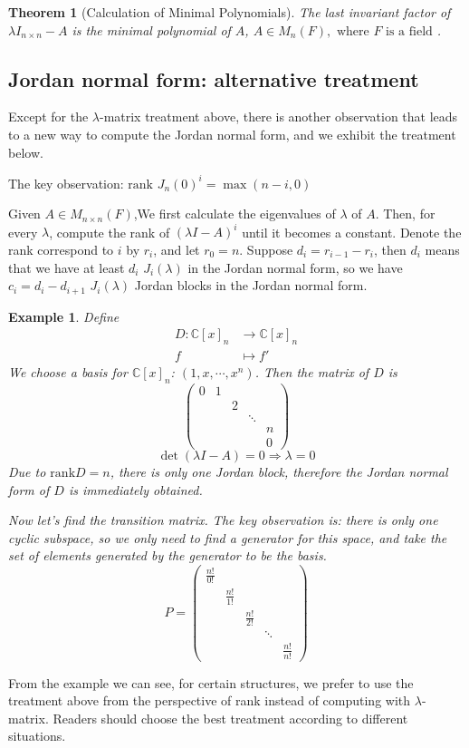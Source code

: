 \documentclass{book}
\newtheorem{theorem}{Theorem}[section]
\newtheorem{example}{Example}[section]
\theoremstyle{definition}
\begin{document}
\begin{theorem}[Calculation of Minimal Polynomials]
The last invariant factor of $\lambda I_{n\times n}-A$ is the minimal polynomial of $A$, $A\in M_n(F),\text{ where }F\text{ is a field}$ .
\end{theorem}


\subsection{Jordan normal form: alternative treatment}
Except for the $\lambda$-matrix treatment above, there is another observation that leads to a new way to compute the Jordan normal form, and we exhibit the treatment below.\par
The key observation: $\text{rank }J_n(0)^i=\max (n-i,0)$\par 
Given $A\in M_{n\times n}(F)$,We first calculate the eigenvalues of $\lambda$ of $A$. Then, for every $\lambda$, compute the rank of $(\lambda I-A)^i$ until it becomes a constant. Denote the rank correspond to $i$ by $r_i$, and let $r_0=n$.
Suppose $d_i=r_{i-1}-r_i$, then $d_i$ means that we have at least $d_i$ $J_i(\lambda)$ in the Jordan normal form, so we have $c_i=d_i-d_{i+1}$ $J_i(\lambda)$ Jordan blocks in the Jordan normal form.
\begin{example}
Define
\begin{align*}
    D: \mathbb{C}[x]_n&\longrightarrow \mathbb{C}[x]_n \\
    f&\longmapsto f'
\end{align*}
We choose a basis for $\mathbb{C}[x]_n$: $(1,x,\cdots,x^n)$. Then the matrix of $D$ is \[\begin{pmatrix}
 0 & 1 &  &  & \\
  &  & 2 &  & \\
  &  &  & \ddots & \\
  &  &  &  &n \\
  &  &  &  &0
\end{pmatrix}\]
\[\det (\lambda I-A)=0 \Longrightarrow \lambda=0\]
Due to $\text{rank} D=n$, there is only one Jordan block, therefore the Jordan normal form of $D$ is immediately obtained.\par
Now let's find the transition matrix. The key observation is: there is only one cyclic subspace, so we only need to find a generator for this space, and take the set of elements generated by the generator to be the basis.
\[P=\begin{pmatrix}
 \frac{n!}{0!} &  &  &  & \\
  & \frac{n!}{1!} &  &  & \\
  &  & \frac{n!}{2!} &  & \\
  &  &  &\ddots  & \\
  &  &  &  &\frac{n!}{n!}
\end{pmatrix}\]
\end{example}
From the example we can see, for certain structures, we prefer to use the treatment above from the perspective of rank instead of computing with $\lambda$-matrix. Readers should choose the best treatment according to different situations.
\end{document}
